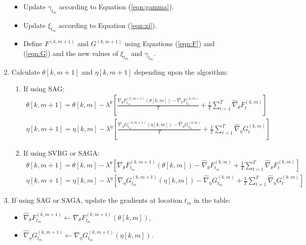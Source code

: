 \begin{enumerate}
\begin{enumerate}
\begin{itemize}
            \item Update $\gamma_{t_m}$ according to Equation (\ref{eqn:gamma}).
            \item Update $\xi_{t_m}$ according to Equation (\ref{eqn:xi}).
            \item Define $F^{(k,m+1)}$ and $G^{(k,m+1)}$ using Equations (\ref{eqn:F}) and (\ref{eqn:G}) and the new values of $\xi_{t_m}$ and $\gamma_{t_m}$.
        \end{itemize}
        \item Calculate $\theta[k,m+1]$ and $\eta[k,m+1]$ depending upon the algorithm:
        \begin{enumerate}
            \item If using SAG:
            \begin{gather}
                \theta[k,m+1] = \theta[k,m] - \lambda^{\theta} \left[\frac{\nabla_\theta F_{t_m}^{(k,m+1)}(\theta[k,m]) - \widehat \nabla_\theta F_{t_m}^{(k,m)}}{T} + \frac{1}{T} \sum_{t=1}^T \widehat \nabla_\theta F^{(k,m)}_{t} \right] \\
                \eta[k,m+1] = \eta[k,m] - \lambda^{\eta} \left[\frac{\nabla_\eta G_{t_m}^{(k,m+1)}(\eta[k,m]) - \widehat \nabla_\eta G_{t_m}^{(k,m)}}{T} + \frac{1}{T} \sum_{t=1}^T \widehat \nabla_\eta G^{(k,m)}_{t} \right]
            \end{gather}
            \item If using SVRG or SAGA:
            \begin{gather}
                \theta[k,m+1] = \theta[k,m] - \lambda^{\theta} \left[\nabla_\theta F_{t_m}^{(k,m+1)}(\theta[k,m]) - \widehat \nabla_\theta F_{t_m}^{(k,m)} + \frac{1}{T} \sum_{t=1}^T \widehat \nabla_\theta F^{(k,m)}_{t} \right] \\
                \eta[k,m+1] = \eta[k,m] - \lambda^{\eta} \left[\nabla_\eta G_{t_m}^{(k,m+1)}(\eta[k,m]) - \widehat \nabla_\eta G_{t_m}^{(k,m)} + \frac{1}{T} \sum_{t=1}^T \widehat \nabla_\eta G^{(k,m)}_{t} \right]
            \end{gather}
        \end{enumerate}
        \item If using SAG or SAGA, update the gradients at location $t_m$ in the table:
        \begin{itemize}
            \item $\widehat \nabla_\theta F_{t_m}^{(k,m+1)} \leftarrow \nabla_\theta F_{t_m}^{(k,m+1)}(\theta[k,m])$,
            \item $\widehat \nabla_\eta G_{t_m}^{(k,m+1)} \leftarrow \nabla_\eta G_{t_m}^{(k,m+1)}(\eta[k,m])$.

\end{itemize}
\end{enumerate}
\end{enumerate}
